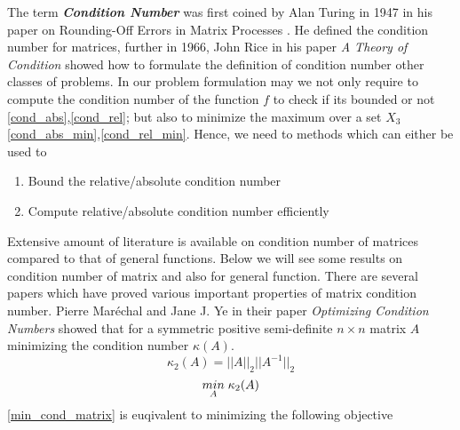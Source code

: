 The term \textbf{\textit{Condition Number}} was first coined by Alan Turing in 1947 in his paper on Rounding-Off Errors in Matrix Processes \cite{turing1948rounding}. He defined the condition number for matrices, further in 1966, John Rice in his paper \textit{A Theory of Condition} \cite{rice1966theory} showed how to formulate the definition of condition number other classes of problems.
\newline\newline In our problem formulation may we not only require to compute the condition number of the function $f$ to check if its bounded or not \ref{cond_abs},\ref{cond_rel}; but also to minimize the maximum over a set $X_3$ \ref{cond_abs_min},\ref{cond_rel_min}.
\newline\newline Hence, we need to methods which can either be used to 
\begin{enumerate}
    \item Bound the relative/absolute condition number
    \item Compute relative/absolute condition number efficiently
\end{enumerate}
Extensive amount of literature is available on condition number of matrices compared to that of general functions. Below we will see some results on condition number of matrix and also for general function.
There are several papers which have proved various important properties of matrix condition number. Pierre Maréchal and Jane J. Ye in their paper \textit{Optimizing Condition Numbers}\cite{marechal2009optimizing} showed that for a symmetric positive semi-definite $n\times n$ matrix $A$ minimizing the condition number $\kappa (A)$.
\begin{equation} \label{cond_matrix}
    \kappa_2 (A) = ||A||_2||A^{-1}||_2
\end{equation}
\begin{equation} \label{min_cond_matrix}
    \underset{A}{min}\hspace{1mm} \kappa_2 (A)
\end{equation}
\ref{min_cond_matrix} is euqivalent to minimizing the following objective
